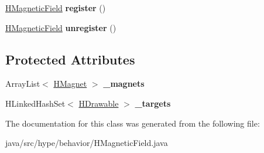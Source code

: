 \begin{DoxyCompactItemize}
\item 
\hypertarget{classhype_1_1behavior_1_1_h_magnetic_field_ab7711de4588828606ed2590e1681279a}{\hyperlink{classhype_1_1behavior_1_1_h_magnetic_field}{H\-Magnetic\-Field} {\bfseries register} ()}\label{classhype_1_1behavior_1_1_h_magnetic_field_ab7711de4588828606ed2590e1681279a}

\item 
\hypertarget{classhype_1_1behavior_1_1_h_magnetic_field_a3b17a1968dee1b61220256a06e10980f}{\hyperlink{classhype_1_1behavior_1_1_h_magnetic_field}{H\-Magnetic\-Field} {\bfseries unregister} ()}\label{classhype_1_1behavior_1_1_h_magnetic_field_a3b17a1968dee1b61220256a06e10980f}

\end{DoxyCompactItemize}
\subsection*{Protected Attributes}
\begin{DoxyCompactItemize}
\item 
\hypertarget{classhype_1_1behavior_1_1_h_magnetic_field_a571dc191ead43a576513fb710a184bb4}{Array\-List$<$ \hyperlink{classhype_1_1behavior_1_1_h_magnetic_field_1_1_h_magnet}{H\-Magnet} $>$ {\bfseries \-\_\-magnets}}\label{classhype_1_1behavior_1_1_h_magnetic_field_a571dc191ead43a576513fb710a184bb4}

\item 
\hypertarget{classhype_1_1behavior_1_1_h_magnetic_field_a2d6fe89f3ad7910e52f5af6f3d2b8c26}{H\-Linked\-Hash\-Set$<$ \hyperlink{classhype_1_1drawable_1_1_h_drawable}{H\-Drawable} $>$ {\bfseries \-\_\-targets}}\label{classhype_1_1behavior_1_1_h_magnetic_field_a2d6fe89f3ad7910e52f5af6f3d2b8c26}

\end{DoxyCompactItemize}


The documentation for this class was generated from the following file\-:\begin{DoxyCompactItemize}
\item 
java/src/hype/behavior/H\-Magnetic\-Field.\-java\end{DoxyCompactItemize}
